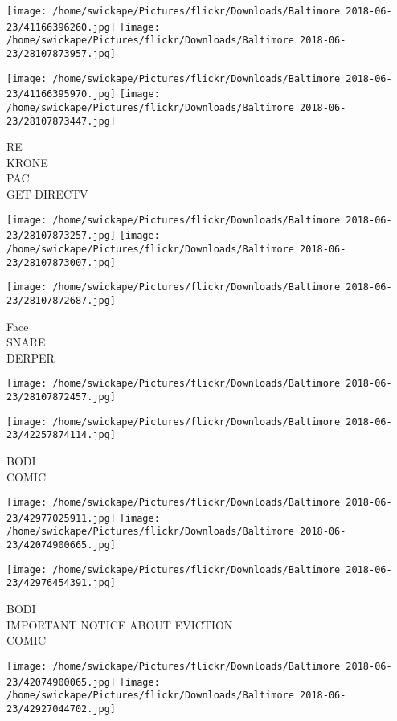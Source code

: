 \documentclass[10pt,letterpaper]{article}
\begin{document}
\texttt{[image: /home/swickape/Pictures/flickr/Downloads/Baltimore 2018-06-23/41166396260.jpg]}
\texttt{[image: /home/swickape/Pictures/flickr/Downloads/Baltimore 2018-06-23/28107873957.jpg]}

\texttt{[image: /home/swickape/Pictures/flickr/Downloads/Baltimore 2018-06-23/41166395970.jpg]}
\texttt{[image: /home/swickape/Pictures/flickr/Downloads/Baltimore 2018-06-23/28107873447.jpg]}

RE\\
KRONE\\
PAC\\
GET DIRECTV
\pagebreak

\texttt{[image: /home/swickape/Pictures/flickr/Downloads/Baltimore 2018-06-23/28107873257.jpg]}
\texttt{[image: /home/swickape/Pictures/flickr/Downloads/Baltimore 2018-06-23/28107873007.jpg]}

\vspace{0.25in}
\texttt{[image: /home/swickape/Pictures/flickr/Downloads/Baltimore 2018-06-23/28107872687.jpg]}

Face\\
SNARE\\
DERPER
\pagebreak

\texttt{[image: /home/swickape/Pictures/flickr/Downloads/Baltimore 2018-06-23/28107872457.jpg]}

\vspace{0.25in}
\texttt{[image: /home/swickape/Pictures/flickr/Downloads/Baltimore 2018-06-23/42257874114.jpg]}

BODI\\
COMIC
\pagebreak

\texttt{[image: /home/swickape/Pictures/flickr/Downloads/Baltimore 2018-06-23/42977025911.jpg]}
\texttt{[image: /home/swickape/Pictures/flickr/Downloads/Baltimore 2018-06-23/42074900665.jpg]}

\vspace{0.25in}
\texttt{[image: /home/swickape/Pictures/flickr/Downloads/Baltimore 2018-06-23/42976454391.jpg]}

BODI\\
IMPORTANT NOTICE ABOUT EVICTION\\
COMIC
\pagebreak

\texttt{[image: /home/swickape/Pictures/flickr/Downloads/Baltimore 2018-06-23/42074900065.jpg]}
\texttt{[image: /home/swickape/Pictures/flickr/Downloads/Baltimore 2018-06-23/42927044702.jpg]}
\end{document}
